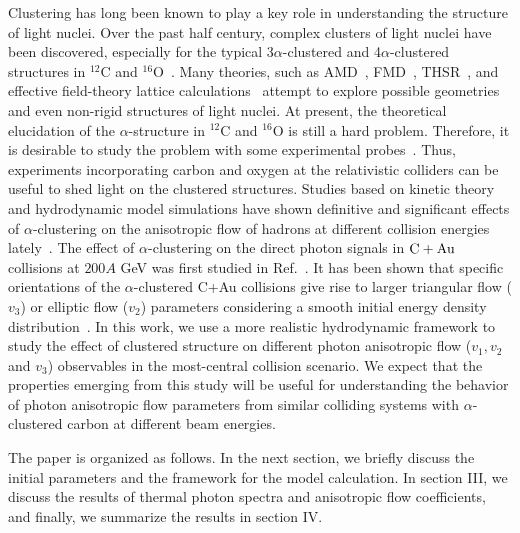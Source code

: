 \documentclass[aps,prc,twocolumn,floatfix,12pts,superscriptaddress]{revtex4}
\begin{document}
Clustering has long been known to play a key role in understanding the structure of light nuclei. Over the past half century, complex clusters of light nuclei have been discovered, especially for the typical 3$\alpha$-clustered and 4$\alpha$-clustered structures in $^{12}$C and $^{16}$O~\cite{gamow, Cook:1957zz,Hoyle:1954zz, Freer:2017gip,Liu:2018eyg,Ren:2018xpt}. Many theories, such as AMD~\cite{Kanada-Enyo:2006rjf}, FMD~\cite{Neff:2003ib}, THSR~\cite{Tohsaki:2001an,Zhou:2016mhb}, and effective field-theory lattice calculations~\cite{Lahde:2013png} attempt to explore possible geometries and even non-rigid structures of light nuclei. At present, the theoretical elucidation of the $\alpha$-structure in $^{12}$C and $^{16}$O is still a hard problem. Therefore, it is desirable to study the problem with some experimental probes~\cite{He:2014iqa,He:2016cwt,Huang:2017ysr,Shi:2021far,Guo:2017tco}.
Thus, experiments incorporating carbon and oxygen at the relativistic colliders can be useful to shed light on the clustered structures. Studies based on kinetic theory and hydrodynamic model simulations have shown definitive and significant effects of $\alpha$-clustering on the anisotropic flow of hadrons   at different collision energies lately~\cite{Rybczynski:2017nrx,Bozek:2014cva,Li:2020vrg,Zhang:2017xda,He:2021uko}. The effect of $\alpha$-clustering on the direct photon signals in ${\rm C+Au}$ collisions at $200A$ GeV was first studied in Ref.~\cite{Dasgupta:2020orj}. It has been shown that specific orientations of the $\alpha$-clustered C+Au collisions give rise to larger triangular flow ($v_3$) or elliptic flow ($v_2$) parameters considering a smooth initial energy density distribution~\cite{Dasgupta:2020orj}. In this work, we use a more realistic hydrodynamic framework to study the effect of clustered structure on different photon anisotropic flow  ($v_1,v_2$ and $v_3$) observables in the most-central collision scenario. { We expect that the properties emerging from this study will be useful for understanding the behavior of photon anisotropic flow parameters from similar colliding systems with $\alpha$-clustered carbon at different beam energies.}

The paper is organized as follows. In the next section, we briefly discuss the initial parameters and the framework for the model calculation. In section III,  we discuss the results of thermal photon spectra and anisotropic flow coefficients, and finally, we summarize the results in section IV.
\end{document}
